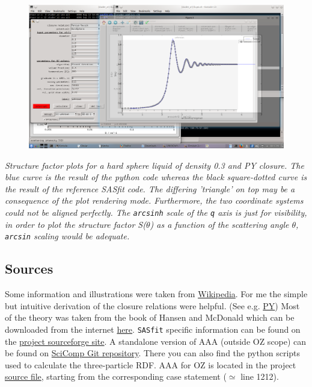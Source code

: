 \documentclass[11pt,a4paper]{article}
\begin{document}
\begin{figure}[htb]
\centering
\includegraphics[width=12cm]{PyOZ-SASfit_SqHS03PY.png}
\end{figure}
\textit{Structure factor plots for a hard sphere liquid of density 0.3 and PY closure. The blue curve is the result of the
python code whereas the black square-dotted curve is the result of the reference SASfit code. The differing 'triangle' on top may be
a consequence of the plot rendering mode. Furthermore, the two coordinate systems could not be aligned perfectly. \newline
The  \texttt{arcsinh} scale of the \texttt{q} axis is just for visibility, in order to plot the structure factor S($\theta$)
as a function of the scattering angle $\theta$, \texttt{arcsin} scaling would be adequate. }



\subsection{Sources}
Some information and illustrations were taken from \href{https://en.wikipedia.org/wiki/Radial_distribution_function}{Wikipedia}.
For me the simple but intuitive derivation of the closure relations were helpful. 
(See e.g. \href{https://en.wikipedia.org/wiki/Percus%E2%80%93Yevick_approximation}{PY})
\newline
Most of the theory was taken from the book of Hansen and McDonald \cite{hansen2006theory} which can be downloaded
from the internet \href{http://www.sciencedirect.com/science/book/9780123705358}{here}. 
\newline
\texttt{SASfit} specific information can be found on the  
\href{http://sourceforge.net/p/sasfit/sasfit/ci/tip/tree/doc/manual/sasfit.pdf}{project sourceforge site}.
\newline
A standalone version of AAA (outside OZ scope) can be found on 
\href{https://gitorious.psi.ch/scicomp/aa4oz/trees/master/src}{SciComp Git repository}. There you can also find 
the python scripts used to calculate the three-particle RDF.
\newline
AAA for OZ is located in the project
\href{http://sourceforge.net/p/sasfit/sasfit/ci/tip/tree/src/sasfit_oz/sasfit_oz_solver.c}{source file},
starting from the corresponding case statement ($\simeq$ line 1212).
\end{document}
